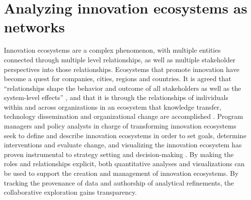 





\section{Analyzing innovation ecosystems as networks}

Innovation ecosystems are a complex phenomenon, with multiple entities connected through multiple level relationships, as well as multiple stakeholder perspectives into those relationships. Ecosystems that promote innovation have become a quest for companies, cities, regions and countries. It is agreed that “relationships shape the behavior and outcome of all stakeholders as well as the system-level effects” \citep{Hwang2012}, and that it is through the relationships of individuals within and across organizations in an ecosystem that knowledge transfer, technology dissemination and organizational change are accomplished \citep{Russell2015}. Program managers and policy analysts in charge of transforming innovation ecosystems seek to define and describe innovation ecosystems in order to set goals, determine interventions and evaluate change, and visualizing the innovation ecosystem has proven instrumental to strategy setting and decision-making \citep{Still2014}. By making the roles and relationships explicit, both quantitative analyses and visualizations can be used to support the creation and management of innovation ecosystems. By tracking the provenance of data and authorship of analytical refinements, the collaborative exploration gains transparency.
